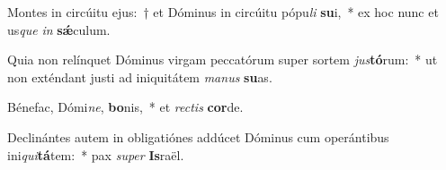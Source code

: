 \item Montes in circúitu ejus:~† et Dóminus in circúitu pópu\textit{li} \textbf{su}i,~* ex hoc nunc et us\textit{que} \textit{in} \textbf{sǽ}culum.
\item Quia non relínquet Dóminus virgam peccatórum super sortem \textit{jus}\textbf{tó}rum:~* ut non exténdant justi ad iniquitátem \textit{ma}\textit{nus} \textbf{su}as.
\item Bénefac, Dómi\textit{ne}, \textbf{bo}nis,~* et \textit{rec}\textit{tis} \textbf{cor}de.
\item Declinántes autem in obligatiónes addúcet Dóminus cum operántibus ini\textit{qui}\textbf{tá}tem:~* pax \textit{su}\textit{per} \textbf{Is}raël.
